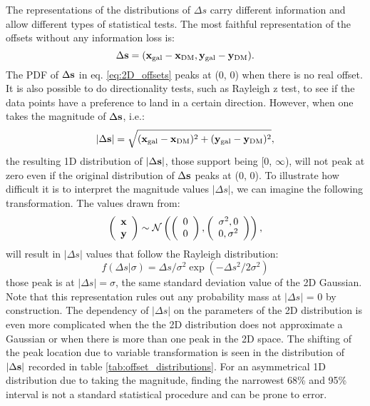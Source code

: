 The representations of the distributions of $\Delta s$ carry
different information and allow different types of statistical tests. 
The most faithful representation of the offsets without any information loss
is:
\begin{equation}
	\Delta {\bf s} = ({\bf x}_{\rm gal} - {\bf x}_{\rm DM}, 
	{\bf y}_{\rm gal} - {\bf y}_{\rm DM} ).
	\label{eq:2D_offsets}
\end{equation}
The PDF of $\Delta {\bf s}$ in eq. \ref{eq:2D_offsets} peaks at (0, 0) when
there is no real offset. It is also possible to do directionality tests,
such as Rayleigh z test, to see if the data points have a preference to land in
a certain direction.
However, when one takes the magnitude of $\Delta {\bf s}$, i.e.:
\begin{equation}
	|\Delta {\bf s}| = \sqrt{({\bf x}_{\rm gal} - {\bf x}_{\rm DM})^2 + 
	({\bf y}_{\rm gal} - {\bf y}_{\rm DM})^2},
	\label{eq:magnitude_offsets}
\end{equation}
the resulting 1D distribution of $|\Delta {\bf s}|$, 
those support being [0, $\infty$),
will not peak at zero even if the original
distribution of $\Delta {\bf s}$ peaks at (0, 0). 
To illustrate how difficult it is to interpret the magnitude values $|\Delta
s|$,  
we can imagine the following transformation.
The values drawn from: 
\begin{equation}
	\left(\begin{array}{c}
			\bf{x}\\
			\bf{y}
		\end{array}
	\right) \sim \mathcal{N}\left(
	\left(
		\begin{array}{c}
			0 \\
			0
		\end{array}
	\right),
	\left(\begin{array}{cc}
		\sigma^2, 0 \\
		0, \sigma^2
	 \end{array}
	\right)
\right),
\end{equation}
will result in $|\Delta s|$ values that follow the Rayleigh distribution:
\begin{equation}
	f(\Delta s | \sigma) = \Delta s /  \sigma^2 \exp(-\Delta s^2 / 2 \sigma^2)
\end{equation}
those peak is at $|\Delta s| = \sigma$, the same standard deviation value of the 2D
Gaussian. Note that this representation  
rules out any probability mass at $|\Delta s|$ = 0 by construction. 
The dependency of $|\Delta s|$ on the parameters of
the 2D distribution is even more
complicated when the the 2D distribution does not approximate a Gaussian 
or when there is more than one peak in the 2D space. 
The shifting of the peak location due to variable transformation 
is seen in the distribution of $|\Delta {\bf s}|$ recorded in table
\ref{tab:offset_distributions}.
For an asymmetrical 1D distribution due to taking the magnitude, 
finding the narrowest 68\% and 95\% interval
is not a standard statistical procedure and can be prone to error.

